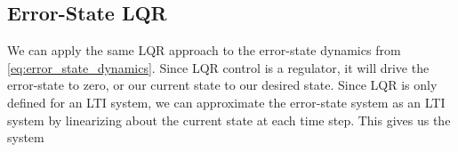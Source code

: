 
\subsection{Error-State LQR}

We can apply the same LQR approach to the error-state dynamics from
\eqref{eq:error_state_dynamics}. Since LQR control is a regulator, it will drive
the error-state to zero, or our current state to our desired state. Since LQR is
only defined for an LTI system, we can approximate the error-state system as an
LTI system by linearizing about the current state at each time step. This gives
us the system





